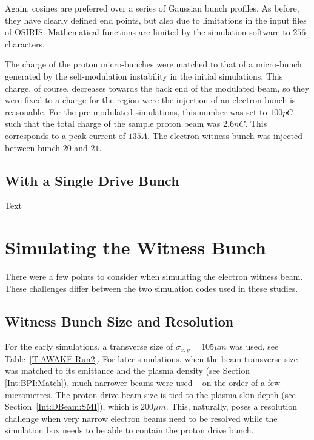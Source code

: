Again, cosines are preferred over a series of Gaussian bunch profiles.
As before, they have clearly defined end points, but also due to limitations in the input files of OSIRIS.
Mathematical functions are limited by the simulation software to $256$ characters.


The charge of the proton micro-bunches were matched to that of a micro-bunch generated by the self-modulation instability in the initial simulations.
This charge, of course, decreases towards the back end of the modulated beam, so they were fixed to a charge for the region were the injection of an electron bunch is reasonable.
For the pre-modulated simulations, this number was set to $100\unit{pC}$ such that the total charge of the sample proton beam was $2.6\unit{nC}$.
This corresponds to a peak current of $135\unit{A}$.
The electron witness bunch was injected between bunch $20$ and $21$.



\subsection{With a Single Drive Bunch}
\label{Sim:PBSingle}

Text

\section{Simulating the Witness Bunch}
\label{Sim:EBeam}

There were a few points to consider when simulating the electron witness beam.
These challenges differ between the two simulation codes used in these studies.

\subsection{Witness Bunch Size and Resolution}
\label{Sim:EBeam:SizeRes}

For the early simulations, a transverse size of $\sigma_{x,y}=105\unit{\mu m}$ was used, see Table~\ref{T:AWAKE-Run2}.
For later simulations, when the beam transverse size was matched to its emittance and the plasma density (see Section \ref{Int:BPI:Match}), much narrower beams were used -- on the order of a few micrometres.
The proton drive beam size is tied to the plasma skin depth (see Section~\ref{Int:DBeam:SMI}), which is $200\unit{\mu m}$.
This, naturally, poses a resolution challenge when very narrow electron beams need to be resolved while the simulation box needs to be able to contain the proton drive bunch.

